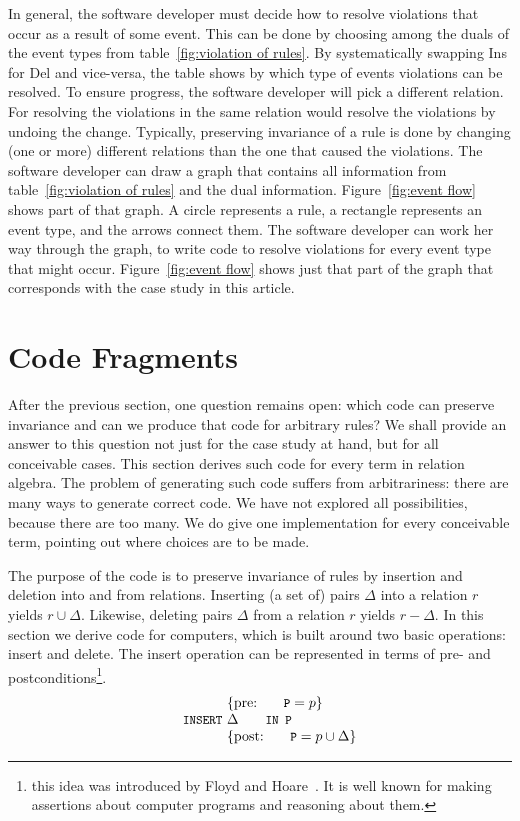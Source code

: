 \documentclass{svproc}
\begin{document}
	In general, the software developer must decide how to resolve violations that occur as a result of some event.
	This can be done by choosing among the duals of the event types from table~\ref{fig:violation of rules}.
	By systematically swapping Ins for Del and vice-versa,
	the table shows by which type of events violations can be resolved.
	To ensure progress, the software developer will pick a different relation.
	For resolving the violations in the same relation would resolve the violations by undoing the change.
        Typically, preserving invariance of a rule is done by changing (one or more) different relations than the one that caused the violations.
	The software developer can draw a graph that contains all information from table~\ref{fig:violation of rules}
	and the dual information.
	Figure~\ref{fig:event flow} shows part of that graph.
	A circle represents a rule, a rectangle represents an event type, and the arrows connect them.
	The software developer can work her way through the graph, to write code to resolve violations for every event type that might occur.
	Figure~\ref{fig:event flow} shows just that part of the graph that corresponds with the case study in this article.

\section{Code Fragments}
\label{sct:Code Fragments}
	After the previous section, one question remains open: which code can preserve invariance and can we produce that code for arbitrary rules?
	We shall provide an answer to this question not just for the case study at hand, but for all conceivable cases.
	This section derives such code for every term in relation algebra.
	The problem of generating such code suffers from arbitrariness: there are many ways to generate correct code.
	We have not explored all possibilities, because there are too many.
	We do give one implementation for every conceivable term, pointing out where choices are to be made.

	The purpose of the code is to preserve invariance of rules by insertion and deletion into and from relations.
	Inserting (a set of) pairs $\Delta$ into a relation $r$ yields $r\cup\Delta$.
	Likewise, deleting pairs $\Delta$ from a relation $r$ yields $r-\Delta$.
	In this section we derive code for computers,
	which is built around two basic operations: insert and delete.
	The insert operation can be represented in terms of pre- and postconditions\footnote{this idea
	was introduced by Floyd and Hoare~\cite{Floyd1967,Hoare1969}.
	It is well known for making assertions about computer programs and reasoning about them.}.
\[\begin{array}{r@{~}l}
&\{\text{pre: }\code{P}=p\}\\
\code{INSERT}&\Delta\code{ IN P}\\
&\{\text{post: }\code{P}=p\cup\Delta\}\\
\end{array}\]
\end{document}
